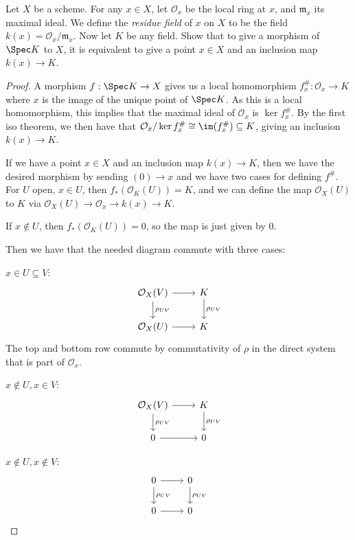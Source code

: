 \begin{exercise}%
	Let $X $ be a scheme. For any $x\in X $, let $\mathcal{O}_x $ be the local ring at $x $, and $\mathfrak{m}_x $ its maximal ideal. We define the \textit{residue field} of $x $ on $X $ to be the field $k(x) = \mathcal{O}_x / \mathfrak{m}_x $. Now let $K $ be any field. Show that to give a morphism of $\Spec K $ to $X $, it is equivalent to give a point $x\in X $ and an inclusion map $k(x) \to K $.
\end{exercise}
\begin{proof}
	A morphism $f: \Spec K \to X $ gives us a local homomorphism $f^\#_x: \mathcal{O}_x \to K $ where $x $ is the image of the unique point of $\Spec K $.
	As this is a local homomorphism, this implies that the maximal ideal of $\mathcal{O}_x $ is $\ker f^\#_x$.
	By the first iso theorem, we then have that $\mathcal{O}_x / \ker f^\#_x \cong \im(f^\#_x) \subseteq K $, giving an inclusion $k(x) \to K $.

	If we have a point $x\in X $ and an inclusion map $k(x) \to K $, then we have the desired morphism by sending $(0) \to x $ and we have two cases for defining $f^\# $.
	For $U $ open, $x\in U $, then $f_\ast(\mathcal{O}_K(U)) = K $, and we can define the map $\mathcal{O}_X(U) $ to $K $ via $\mathcal{O}_X(U) \to \mathcal{O}_x \to k(x) \to K $.

	If $x\notin U $, then $f_\ast(\mathcal{O}_K(U)) = 0 $, so the map is just given by 0.

	Then we have that the needed diagram commute with three cases:

	$x\in U \subseteq V$:
	\[
	\begin{tikzcd}
	{\mathcal{O}_X(V)} & K\\
	{\mathcal{O}_X(U)} & K
	\arrow[from=1-1,to=1-2]
	\arrow["\rho_{UV}",from=1-1,to=2-1]
	\arrow[from=2-1,to=2-2]
	\arrow["\rho _{UV}",from=1-2,to=2-2]
	\end{tikzcd}
	\]
	The top and bottom row commute by commutativity of $\rho $ in the direct system that is part of $\mathcal{O}_x $.

	$x\notin U, x \in V $:
	\[
	\begin{tikzcd}
	\mathcal{O}_X(V) & K\\
	0 & 0
	\arrow[from=1-1,to=1-2]
	\arrow["\rho_{UV}",from=1-1,to=2-1]
	\arrow[from=2-1,to=2-2]
	\arrow["\rho _{UV}",from=1-2,to=2-2]
	\end{tikzcd}
	\]

	$x\notin U, x \notin V $:
	\[
	\begin{tikzcd}
	0 & 0\\
	0 & 0
	\arrow[from=1-1,to=1-2]
	\arrow["\rho_{UV}",from=1-1,to=2-1]
	\arrow[from=2-1,to=2-2]
	\arrow["\rho _{UV}",from=1-2,to=2-2]
	\end{tikzcd}
	\]
\end{proof}

